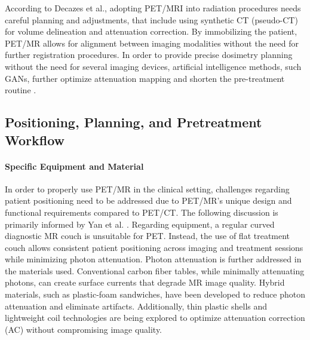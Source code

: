 \documentclass[11pt]{article} %
\begin{document}
\begin{multicols}{2}
	
According to Decazes et al., adopting PET/MRI into radiation procedures needs careful planning and adjustments, that include using synthetic CT (pseudo-CT) for volume delineation and attenuation correction. %
By immobilizing the patient, PET/MR allows for alignment between imaging modalities without the need for further registration procedures. In order to provide precise dosimetry planning without the need for several imaging devices, artificial intelligence methods, such GANs, further optimize attenuation mapping and shorten the pre-treatment routine \cite{decazes2021}.
	

\subsection{Positioning, Planning, and Pretreatment Workflow}

\paragraph{Specific Equipment and Material}
In order to properly use PET/MR in the clinical setting, challenges regarding patient positioning need to be addressed due to PET/MR's  %
unique design and functional requirements compared to PET/CT. The following discussion is primarily informed by Yan et al. \cite{yan2024}.%
Regarding equipment, a regular curved diagnostic MR couch is unsuitable for PET. Instead, the use of flat treatment couch allows consistent patient positioning across imaging and treatment sessions while minimizing photon attenuation. Photon attenuation is further addressed in the materials used. Conventional carbon fiber tables, while minimally attenuating photons, can create surface currents that degrade MR image quality. Hybrid materials, such as plastic-foam sandwiches, have been developed to reduce photon attenuation and eliminate artifacts. Additionally, thin plastic shells and lightweight coil technologies are being explored to optimize attenuation correction (AC) without compromising image quality. \cite{yan2024, ziegler2013}


\end{multicols}
\end{document}
